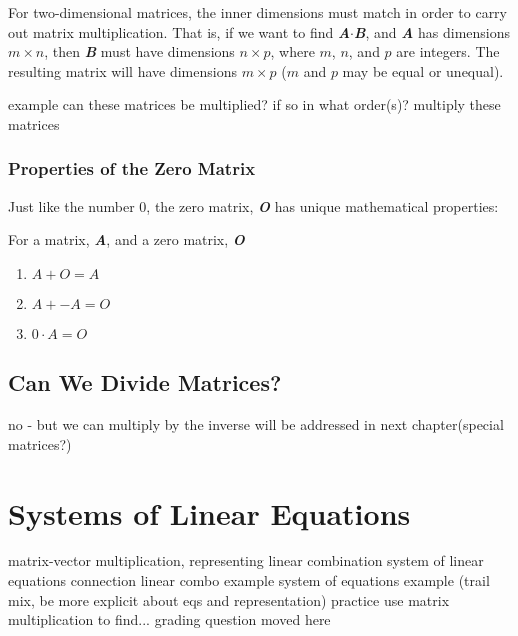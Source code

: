 \begin{mdframed}[style = important, frametitle = {Matrix Multiplication}]
For two-dimensional matrices, the inner dimensions must match in order to carry out matrix multiplication. That is, if we want to find \textbf{\textit{A}}$\cdot$\textbf{\textit{B}}, and \textbf{\textit{A}} has dimensions $m \times n$, then \textbf{\textit{B}} must have dimensions $n \times p$, where $m$, $n$, and $p$ are integers. The resulting matrix will have dimensions $m \times p$ ($m$ and $p$ may be equal or unequal).
\end{mdframed}

example
	can these matrices be multiplied? if so in what order(s)?
	multiply these matrices
	
\subsubsection{Properties of the Zero Matrix}
Just like the number 0, the zero matrix, \textbf{\textit{O}} has unique mathematical properties:
\begin{mdframed}[style = important, frametitle = {Properties of the Zero Matrix}]
For a matrix, \textbf{\textit{A}}, and a zero matrix, \textbf{\textit{O}}
\begin{enumerate}
\item $\mathbf{\mathit{A}} + \mathbf{\mathit{O}} = \mathbf{\mathit{A}}$
\item $\mathbf{\mathit{A}} + \mathbf{\mathit{-A}} = \mathbf{\mathit{O}}$
\item $0 \cdot \mathbf{\mathit{A}} = \mathbf{\mathit{O}}$
\end{enumerate}
\end{mdframed}

\subsection{Can We Divide Matrices?}
no - but we can multiply by the inverse
will be addressed in next chapter(special matrices?)
\section{Systems of Linear Equations}
matrix-vector multiplication, representing linear combination
system of linear equations connection
linear combo example
system of equations example (trail mix, be more explicit about eqs and representation)
practice
	use matrix multiplication to find...
	grading question moved here

